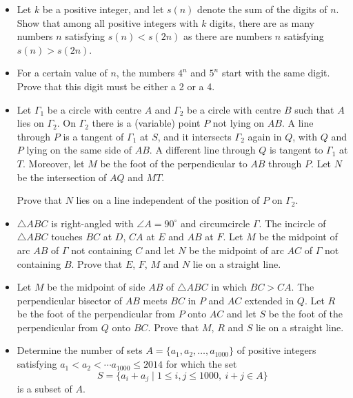 \documentclass[12pt]{article}
\begin{document}
\begin{itemize}
\item %
Let $k$ be a positive integer, and let $s(n)$ denote the sum of the digits of $n$. Show that among all positive integers with $k$ digits, there are as many numbers $n$ satisfying $s(n)<s(2n)$ as there are numbers $n$ satisfying $s(n)>s(2n)$.


\item %
For a certain value of $n$, the numbers $4^n$ and $5^n$ start with the same digit. Prove that this digit must be either a 2 or a 4.


\item %
Let $\Gamma_1$ be a circle with centre $A$ and $\Gamma_2$ be a circle with centre $B$ such that $A$ lies on $\Gamma_2$. On $\Gamma_2$ there is a (variable) point $P$ not lying on $AB$. A line through $P$ is a tangent of $\Gamma_1$ at $S$, and it intersects $\Gamma_2$ again in $Q$, with $Q$ and $P$ lying on the same side of $AB$. A different line through $Q$ is tangent to $\Gamma_1$ at $T$. Moreover, let $M$ be the foot of the perpendicular to $AB$ through $P$. Let $N$ be the intersection of $AQ$ and $MT$.
	
Prove that $N$ lies on a line independent of the position of $P$ on $\Gamma_2$.


\item %
$\triangle ABC$ is right-angled with $\angle A=90^\circ$ and circumcircle $\Gamma$. The incircle of $\triangle ABC$ touches $BC$ at $D$, $CA$ at $E$ and $AB$ at $F$. Let $M$ be the midpoint of arc $AB$ of $\Gamma$ not containing $C$ and let $N$ be the midpoint of arc $AC$ of $\Gamma$ not containing $B$. Prove that $E$, $F$, $M$ and $N$ lie on a straight line.


\item %
Let $M$ be the midpoint of side $AB$ of $\triangle ABC$ in which $BC>CA$. The perpendicular bisector of $AB$ meets $BC$ in $P$ and $AC$ extended in $Q$. Let $R$ be the foot of the perpendicular from $P$ onto $AC$ and let $S$ be the foot of the perpendicular from $Q$ onto $BC$. Prove that $M$, $R$ and $S$ lie on a straight line.


\item %
Determine the number of sets $A=\{a_1,a_2,\ldots, a_{1000}\}$ of positive integers satisfying $a_1<a_2<\cdots a_{1000}\le 2014$ for which the set
	\[ S = \{a_i+a_j\mid 1\le i,j\le 1000,\ i+j\in A\} \]
is a subset of $A$.


\end{itemize}

\vfill

\centering
\begin{BVerbatim}
\end{BVerbatim}
\end{document}
